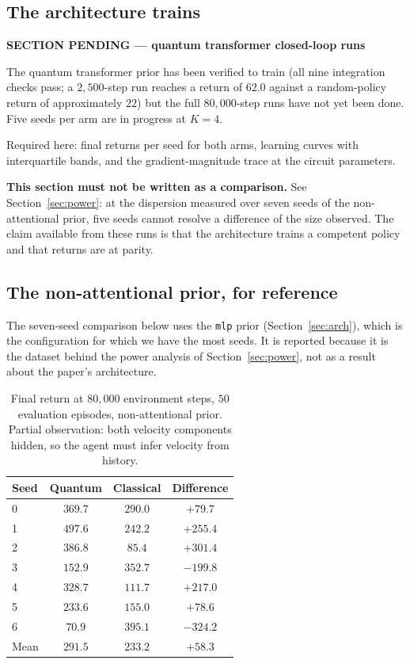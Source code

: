 \documentclass[11pt]{article}
\newif\ifdraft
\newenvironment{pendingbox}[1]
  {\par\vspace{3pt}\noindent
   \begin{lrbox}{\pendbox}\begin{minipage}{0.93\linewidth}\small
   \textcolor{PendFG}{\textbf{SECTION PENDING --- #1}}\par\vspace{3pt}
   \color{PendFG}}
  {\end{minipage}\end{lrbox}%
   \ifdraft\fcolorbox{PendFG}{PendBG}{\usebox{\pendbox}}\fi
   \par\vspace{4pt}}
\begin{document}
\subsection{The architecture trains}
\begin{pendingbox}{quantum transformer closed-loop runs}
The quantum transformer prior has been verified to train
(all nine integration checks pass; a $2{,}500$-step run reaches a return
of $62.0$ against a random-policy return of approximately $22$) but the
full $80{,}000$-step runs have not yet been done. Five seeds per arm are
in progress at $K = 4$.

Required here: final returns per seed for both arms, learning curves
with interquartile bands, and the gradient-magnitude trace at the
circuit parameters.

\textbf{This section must not be written as a comparison.} See
Section~\ref{sec:power}: at the dispersion measured over seven seeds of
the non-attentional prior, five seeds cannot resolve a difference of the
size observed. The claim available from these runs is that the
architecture trains a competent policy and that returns are at parity.
\end{pendingbox}

\subsection{The non-attentional prior, for reference}
The seven-seed comparison below uses the \texttt{mlp} prior
(Section~\ref{sec:arch}), which is the configuration for which we have
the most seeds. It is reported because it is the dataset behind the
power analysis of Section~\ref{sec:power}, not as a result about the
paper's architecture.

\begin{table}[h]\centering\small
\caption{Final return at $80{,}000$ environment steps, $50$ evaluation
episodes, non-attentional prior. Partial observation: both velocity
components hidden, so the agent must infer velocity from history.}
\label{tab:po}
\begin{tabular}{lccc}
\toprule
Seed & Quantum & Classical & Difference \\
\midrule
0 & $369.7$ & $290.0$ & $+79.7$ \\
1 & $497.6$ & $242.2$ & $+255.4$ \\
2 & $386.8$ & $85.4$  & $+301.4$ \\
3 & $152.9$ & $352.7$ & $-199.8$ \\
4 & $328.7$ & $111.7$ & $+217.0$ \\
5 & $233.6$ & $155.0$ & $+78.6$ \\
6 & $70.9$  & $395.1$ & $-324.2$ \\
\midrule
Mean & $291.5$ & $233.2$ & $+58.3$ \\
\bottomrule
\end{tabular}
\end{table}
\end{document}
